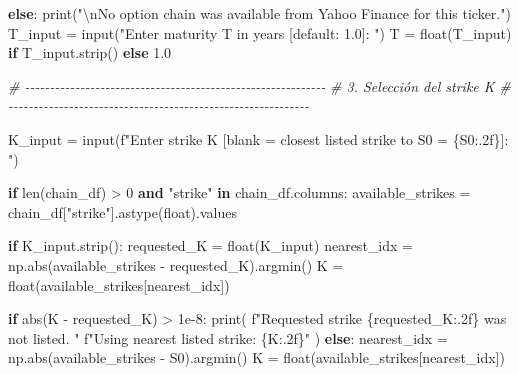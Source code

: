 \documentclass[
  11pt,
]{article}
\newenvironment{Shaded}{}{}
\newcommand{\BuiltInTok}[1]{\textcolor[rgb]{0.00,0.50,0.00}{#1}}
\newcommand{\CharTok}[1]{\textcolor[rgb]{0.25,0.44,0.63}{#1}}
\newcommand{\CommentTok}[1]{\textcolor[rgb]{0.38,0.63,0.69}{\textit{#1}}}
\newcommand{\ControlFlowTok}[1]{\textcolor[rgb]{0.00,0.44,0.13}{\textbf{#1}}}
\newcommand{\DecValTok}[1]{\textcolor[rgb]{0.25,0.63,0.44}{#1}}
\newcommand{\FloatTok}[1]{\textcolor[rgb]{0.25,0.63,0.44}{#1}}
\newcommand{\KeywordTok}[1]{\textcolor[rgb]{0.00,0.44,0.13}{\textbf{#1}}}
\newcommand{\NormalTok}[1]{#1}
\newcommand{\OperatorTok}[1]{\textcolor[rgb]{0.40,0.40,0.40}{#1}}
\newcommand{\SpecialCharTok}[1]{\textcolor[rgb]{0.25,0.44,0.63}{#1}}
\newcommand{\SpecialStringTok}[1]{\textcolor[rgb]{0.73,0.40,0.53}{#1}}
\newcommand{\StringTok}[1]{\textcolor[rgb]{0.25,0.44,0.63}{#1}}
\begin{document}
\begin{Shaded}
\begin{Highlighting}[]
\ControlFlowTok{else}\NormalTok{:}
    \BuiltInTok{print}\NormalTok{(}\StringTok{"}\CharTok{\textbackslash{}n}\StringTok{No option chain was available from Yahoo Finance for this ticker."}\NormalTok{)}
\NormalTok{    T\_input }\OperatorTok{=} \BuiltInTok{input}\NormalTok{(}\StringTok{"Enter maturity T in years [default: 1.0]: "}\NormalTok{)}
\NormalTok{    T }\OperatorTok{=} \BuiltInTok{float}\NormalTok{(T\_input) }\ControlFlowTok{if}\NormalTok{ T\_input.strip() }\ControlFlowTok{else} \FloatTok{1.0}


\CommentTok{\# {-}{-}{-}{-}{-}{-}{-}{-}{-}{-}{-}{-}{-}{-}{-}{-}{-}{-}{-}{-}{-}{-}{-}{-}{-}{-}{-}{-}{-}{-}{-}{-}{-}{-}{-}{-}{-}{-}{-}{-}{-}{-}{-}{-}{-}{-}{-}{-}{-}{-}{-}{-}{-}{-}{-}{-}{-}{-}{-}{-}}
\CommentTok{\# 3. Selección del strike K}
\CommentTok{\# {-}{-}{-}{-}{-}{-}{-}{-}{-}{-}{-}{-}{-}{-}{-}{-}{-}{-}{-}{-}{-}{-}{-}{-}{-}{-}{-}{-}{-}{-}{-}{-}{-}{-}{-}{-}{-}{-}{-}{-}{-}{-}{-}{-}{-}{-}{-}{-}{-}{-}{-}{-}{-}{-}{-}{-}{-}{-}{-}{-}}

\NormalTok{K\_input }\OperatorTok{=} \BuiltInTok{input}\NormalTok{(}\SpecialStringTok{f"Enter strike K [blank = closest listed strike to S0 = }\SpecialCharTok{\{}\NormalTok{S0}\SpecialCharTok{:.2f\}}\SpecialStringTok{]: "}\NormalTok{)}

\ControlFlowTok{if} \BuiltInTok{len}\NormalTok{(chain\_df) }\OperatorTok{\textgreater{}} \DecValTok{0} \KeywordTok{and} \StringTok{"strike"} \KeywordTok{in}\NormalTok{ chain\_df.columns:}
\NormalTok{    available\_strikes }\OperatorTok{=}\NormalTok{ chain\_df[}\StringTok{"strike"}\NormalTok{].astype(}\BuiltInTok{float}\NormalTok{).values}

    \ControlFlowTok{if}\NormalTok{ K\_input.strip():}
\NormalTok{        requested\_K }\OperatorTok{=} \BuiltInTok{float}\NormalTok{(K\_input)}
\NormalTok{        nearest\_idx }\OperatorTok{=}\NormalTok{ np.}\BuiltInTok{abs}\NormalTok{(available\_strikes }\OperatorTok{{-}}\NormalTok{ requested\_K).argmin()}
\NormalTok{        K }\OperatorTok{=} \BuiltInTok{float}\NormalTok{(available\_strikes[nearest\_idx])}

        \ControlFlowTok{if} \BuiltInTok{abs}\NormalTok{(K }\OperatorTok{{-}}\NormalTok{ requested\_K) }\OperatorTok{\textgreater{}} \FloatTok{1e{-}8}\NormalTok{:}
            \BuiltInTok{print}\NormalTok{(}
                \SpecialStringTok{f"Requested strike }\SpecialCharTok{\{}\NormalTok{requested\_K}\SpecialCharTok{:.2f\}}\SpecialStringTok{ was not listed. "}
                \SpecialStringTok{f"Using nearest listed strike: }\SpecialCharTok{\{}\NormalTok{K}\SpecialCharTok{:.2f\}}\SpecialStringTok{"}
\NormalTok{            )}
    \ControlFlowTok{else}\NormalTok{:}
\NormalTok{        nearest\_idx }\OperatorTok{=}\NormalTok{ np.}\BuiltInTok{abs}\NormalTok{(available\_strikes }\OperatorTok{{-}}\NormalTok{ S0).argmin()}
\NormalTok{        K }\OperatorTok{=} \BuiltInTok{float}\NormalTok{(available\_strikes[nearest\_idx])}


\end{Highlighting}
\end{Shaded}
\end{document}
